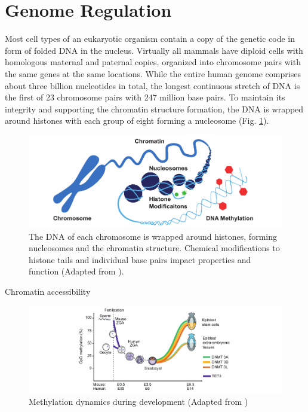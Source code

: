\section{Genome Regulation}
\label{sec:intro:bio}

Most cell types of an eukaryotic organism contain a copy of the genetic code in form of folded DNA in the nucleus.
Virtually all mammals have diploid cells with homologous maternal and paternal copies, organized into chromosome pairs with the same genes at the same locations.
While the entire human genome comprises about three billion nucleotides in total, the longest continuous stretch of DNA is the first of 23 chromosome pairs with 247 million base pairs. 
To maintain its integrity and supporting the chromatin structure formation, the DNA is wrapped around histones with each group of eight forming a nucleosome (Fig. \ref{fig:intro:chromatin}).


\begin{figure}[h]
	\centering
	\includegraphics[width=1.0\textwidth]{figures/intro/chromatin.pdf}
	\captionsetup{format=plain}
	\caption[Chromosome to nucleotide structure]{The DNA of each chromosome is wrapped around histones, forming nucleosomes and the chromatin structure. Chemical modifications to histone tails and individual base pairs impact properties and function (Adapted from \cite{zymo2020}).}
	\label{fig:intro:chromatin}
\end{figure}

Chromatin accessibility \cite{Li2007, Klemm2019}



\begin{figure}[h]
	\centering
	\includegraphics[width=1.0\textwidth]{figures/intro/methylation.pdf}
	\captionsetup{format=plain}
	\caption[DNA methylation dynamics]{Methylation dynamics during development (Adapted from \cite{Greenberg2019})}
	\label{fig:intro:methylation}
\end{figure}

